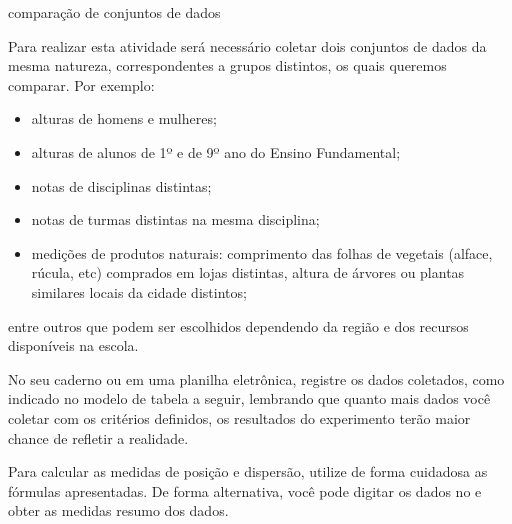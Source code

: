 \begin{task}{ comparação de conjuntos de dados}

Para realizar esta atividade será necessário coletar dois conjuntos de dados da mesma natureza, correspondentes a grupos distintos, os quais queremos comparar. Por exemplo:
\begin{itemize}
\item {} 
alturas de homens e mulheres;

\item {} 
alturas de alunos de 1º e de 9º ano do Ensino Fundamental;

\item {} 
notas de disciplinas distintas;

\item {} 
notas de turmas distintas na mesma disciplina;

\item {} 
medições de produtos naturais: comprimento das folhas de vegetais (alface, rúcula, etc) comprados em lojas distintas, altura de árvores ou plantas similares locais da cidade distintos;

\end{itemize}

entre outros que podem ser escolhidos dependendo da região e dos recursos disponíveis na escola.

No seu caderno ou em uma planilha eletrônica, registre os dados coletados, como indicado no modelo de tabela a seguir, lembrando que quanto mais dados você coletar com os critérios definidos, os resultados do experimento terão maior chance de refletir a realidade.

Para calcular as medidas de posição e dispersão, utilize de forma cuidadosa as  fórmulas apresentadas. De forma alternativa, você pode digitar os dados no  e obter as medidas resumo dos dados.



\end{task}
